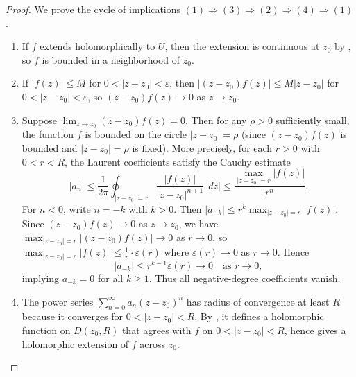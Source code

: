 \begin{proof}
    We prove the cycle of implications $(1) \Rightarrow (3) \Rightarrow (2) \Rightarrow (4) \Rightarrow (1)$.

    \begin{enumerate}
        \item[$(1) \Rightarrow (3)$:] If $f$ extends holomorphically to $U$, then the extension is continuous at $z_0$ by , so $f$ is bounded in a neighborhood of $z_0$.

        \item[$(3) \Rightarrow (2)$:] If $|f(z)| \le M$ for $0 < |z - z_0| < \varepsilon$, then $|(z - z_0) f(z)| \le M |z - z_0|$ for $0 < |z - z_0| < \varepsilon$, so $(z - z_0) f(z) \to 0$ as $z \to z_0$.

        \item[$(2) \Rightarrow (4)$:] Suppose $\lim_{z \to z_0} (z - z_0) f(z) = 0$. Then for any $\rho > 0$ sufficiently small, the function $f$ is bounded on the circle $|z - z_0| = \rho$ (since $(z - z_0) f(z)$ is bounded and $|z - z_0| = \rho$ is fixed). More precisely, for each $r > 0$ with $0 < r < R$, the Laurent coefficients satisfy the Cauchy estimate
        $$|a_n| \le \frac{1}{2\pi} \oint_{|z - z_0| = r} \frac{|f(z)|}{|z - z_0|^{n+1}}\,|dz| \le \frac{\max_{|z - z_0| = r} |f(z)|}{r^n}.$$
        For $n < 0$, write $n = -k$ with $k > 0$. Then $|a_{-k}| \le r^k \max_{|z - z_0| = r} |f(z)|$. Since $(z - z_0) f(z) \to 0$ as $z \to z_0$, we have $\max_{|z - z_0| = r} |(z - z_0) f(z)| \to 0$ as $r \to 0$, so $\max_{|z - z_0| = r} |f(z)| \le \frac{1}{r} \cdot \varepsilon(r)$ where $\varepsilon(r) \to 0$ as $r \to 0$. Hence
        $$|a_{-k}| \le r^{k-1} \varepsilon(r) \to 0 \quad \text{as } r \to 0,$$
        implying $a_{-k} = 0$ for all $k \ge 1$. Thus all negative-degree coefficients vanish.

        \item[$(4) \Rightarrow (1)$:] The power series $\sum_{n=0}^\infty a_n (z - z_0)^n$ has radius of convergence at least $R$ because it converges for $0 < |z - z_0| < R$. By , it defines a holomorphic function on $D(z_0, R)$ that agrees with $f$ on $0 < |z - z_0| < R$, hence gives a holomorphic extension of $f$ across $z_0$.
    \end{enumerate}
\end{proof}
